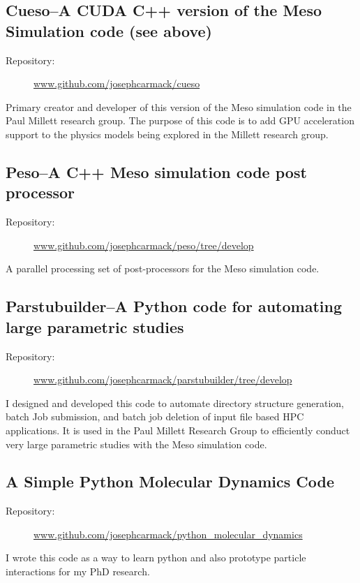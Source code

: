 \documentclass[10pt]{article}
\begin{document}
\subsection{Cueso--A CUDA C++ version of the Meso Simulation code (see above)}
\begin{description}
    \item[Repository:] \url{www.github.com/josephcarmack/cueso}
\end{description}
Primary creator and developer of this version of the Meso simulation code in
the Paul Millett research group. The purpose of this code is to add GPU acceleration
support to the physics models being explored in the Millett research group.

\subsection{Peso--A C++ Meso simulation code post processor}
\begin{description}
    \item[Repository:] \url{www.github.com/josephcarmack/peso/tree/develop}
\end{description}
A parallel processing set of post-processors for the Meso simulation code.

\subsection{Parstubuilder--A Python code for automating large parametric studies}
\begin{description}
    \item[Repository:] \url{www.github.com/josephcarmack/parstubuilder/tree/develop}
\end{description}
I designed and developed this code to automate directory structure generation,
batch Job submission, and batch job deletion of input file based HPC
applications. It is used in the Paul Millett Research Group to efficiently
conduct very large parametric studies with the Meso simulation code.

\subsection{A Simple Python Molecular Dynamics Code}
\begin{description}
    \item[Repository:] \url{www.github.com/josephcarmack/python\_molecular\_dynamics}
\end{description}
I wrote this code as a way to learn python and also prototype particle interactions
for my PhD research.
\end{document}
